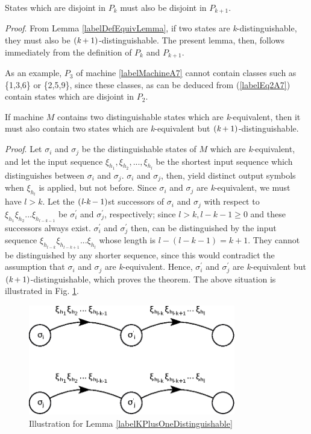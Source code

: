 \documentclass[a4paper]{report}
\begin{document}
    \lemma States which are disjoint in $P_k$ must also be disjoint in $P_{k+1}$.

    \emph{Proof}. From Lemma \ref{labelDefEquivLemma}, if two states are \emph{k}-distinguishable, they must also be $(\emph{k} + 1)$-distinguishable. The present lemma, then, follows immediately from the definition of $P_k$ and $P_{k+1}$.

    As an example, $P_3$ of machine \ref{labelMachineA7} cannot contain classes such as \{1,3,6\} or \{2,5,9\}, since these classes, as can be deduced from (\ref{labelEq2A7}) contain states which are disjoint in $P_2$.

    \lemma \label{labelKPlusOneDistinguishable} If machine $M$ contains two distinguishable states which are \emph{k}-equivalent, then it must also contain two states which are \emph{k}-equivalent but $(\emph{k}+1)$-distinguishable.

    \emph{Proof}. Let $\sigma_i$ and $\sigma_j$ be the distinguishable states of $M$ which are \emph{k}-equivalent, and let the input sequence $ \xi_{h_{1}}, \xi_{h_{2}}, ..., \xi_{h_{l}} $ be the shortest input sequence which distinguishes between $ \sigma_i $ and $ \sigma_j $. $ \sigma_i $ and $ \sigma_j $, then, yield distinct output symbols when $ \xi_{h_{l}} $ is applied, but not before. Since $ \sigma_i $  and $ \sigma_j $ are \emph{k}-equivalent, we must have $ l > k $. Let the $(\emph{l-k}-1)$st successors of $\sigma_i$ and $\sigma_j$ with respect to $ \xi_{h_{1}} \xi_{h_{2}} ... \xi_{h_{l-k-1}} $ be $\sigma^{'}_i$ and $\sigma^{'}_j$, respectively; since $ l > k, l-k-1 \geq 0 $ and these successors always exist. $\sigma^{'}_i$ and $ \sigma^{'}_j$ then, can be distinguished by the input sequence $ \xi_{h_{l-k}}  \xi_{h_{l-k + 1 }  } ... \xi_{h_{l}} $ whose length is $ l - (l-k-1) = k + 1$. They cannot be distinguished by any shorter sequence, since this would contradict the assumption that $ \sigma_i $ and $\sigma_j$ are \emph{k}-equivalent. Hence, $\sigma^{'}_i$ and $\sigma^{'}_j$ are \emph{k}-equivalent but $(\emph{k}+1)$-distinguishable, which proves the theorem. The above situation is illustrated in Fig. \ref{fig:kPlusOneDistinguishable}.

    \begin{figure}[!h]
        \centering
        \includegraphics[width=256pt,clip]{images/eps/kPlusOneDistinguishablePath}
        \caption{Illustration for Lemma \ref{labelKPlusOneDistinguishable} }
        \label{fig:kPlusOneDistinguishable}
    \end{figure}
\end{document}
